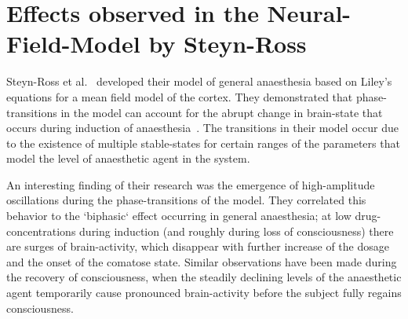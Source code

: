 \section{Effects observed in the Neural-Field-Model by Steyn-Ross}\label{sec:effects-observed-in-the-neural-field-model-by-steyn-ross}
Steyn-Ross et al.\ \cite{steyn_ross_modelling_2004, steyn_ross_sleep_2005, hutt_progress_2011} developed their
model of general anaesthesia based on Liley's\cite{liley_continuum_1999} equations for a mean field model of the cortex.
They demonstrated that phase-transitions in the model can account for the abrupt change
in brain-state that occurs during induction of anaesthesia~\cite{steyn_ross_modelling_2004}.
The transitions in their model occur due to the existence of multiple stable-states for certain ranges of the
parameters that model the level of anaesthetic agent in the system.

An interesting finding of their research was the emergence of high-amplitude oscillations during the phase-transitions
of the model.
They correlated this behavior to the `biphasic` effect occurring in general anaesthesia;
at low drug-concentrations during induction (and roughly during loss of consciousness)
there are surges of brain-activity,
which disappear with further increase of the dosage and the onset of the comatose state.
Similar observations have been made during the recovery of consciousness,
when the steadily declining levels of the anaesthetic agent temporarily cause pronounced brain-activity before the
subject fully regains consciousness.

